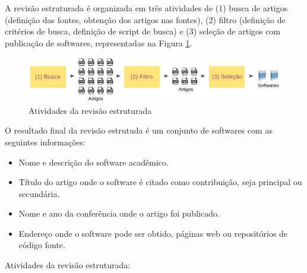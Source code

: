A revisão estruturada é organizada em três atividades de (1) busca de artigos
(definição das fontes, obtenção dos artigos nas fontes), (2) filtro (definição
de critérios de busca, definição de script de busca) e (3) seleção de artigos
com publicação de softwares, representadas na Figura
\ref{figura-revisao-estruturada}.

\begin{figure}[h]
  \center
  \includegraphics[scale=0.21]{imagens/revisao-estruturada.png}
  \caption{Atividades da revisão estruturada}
  \label{figura-revisao-estruturada}
\end{figure}

O resultado final da revisão estrutuda é um conjunto de softwares com as
seguintes informações:

\begin{itemize}
  \item Nome e descrição do software acadêmico.
  \item Título do artigo onde o software é citado como contribuição, seja principal ou secundária.
  \item Nome e ano da conferência onde o artigo foi publicado.
  \item Endereço onde o software pode ser obtido, páginas web ou repositórios de código fonte.
\end{itemize}

Atividades da revisão estruturada:

